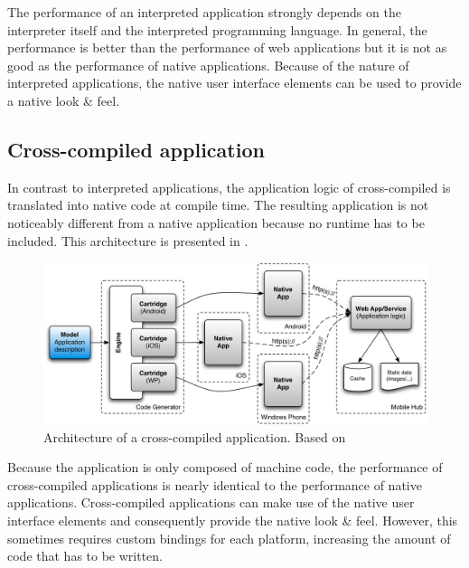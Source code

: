 The performance of an interpreted application strongly depends on the interpreter itself and the interpreted programming language. In general, the performance is better than the performance of web applications but it is not as good as the performance of native applications. Because of the nature of interpreted applications, the native user interface elements can be used to provide a native look \& feel.


\subsection{Cross-compiled application}

In contrast to interpreted applications, the application logic of cross-compiled is translated into native code at compile time. The resulting application is not noticeably different from a native application because no runtime has to be included. This architecture is presented in . 

\begin{figure}[h]
    \begin{center}
        \includegraphics[width=\textwidth]{figs/crosscompiled.pdf}
        \caption{Architecture of a cross-compiled application. Based on \cite{Friese}}
        \label{fig:crosscompiled}
    \end{center}
\end{figure} 

Because the application is only composed of machine code, the performance of cross-compiled applications is nearly identical to the performance of native applications. Cross-compiled applications can make use of the native user interface elements and consequently provide the native look \& feel. However, this sometimes requires custom bindings for each platform, increasing the amount of code that has to be written. 

